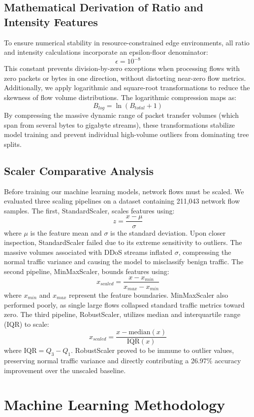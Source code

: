 \documentclass[journal]{IEEEtran}
\begin{document}
\subsection{Mathematical Derivation of Ratio and Intensity Features}
To ensure numerical stability in resource-constrained edge environments, all ratio and intensity calculations incorporate an epsilon-floor denominator:
$$\epsilon = 10^{-8}$$
This constant prevents division-by-zero exceptions when processing flows with zero packets or bytes in one direction, without distorting near-zero flow metrics. Additionally, we apply logarithmic and square-root transformations to reduce the skewness of flow volume distributions. The logarithmic compression maps as:
$$B_{log} = \ln(B_{total} + 1)$$
By compressing the massive dynamic range of packet transfer volumes (which span from several bytes to gigabyte streams), these transformations stabilize model training and prevent individual high-volume outliers from dominating tree splits.

\subsection{Scaler Comparative Analysis}
Before training our machine learning models, network flows must be scaled. We evaluated three scaling pipelines on a dataset containing 211,043 network flow samples. The first, StandardScaler, scales features using:
$$z = \frac{x - \mu}{\sigma}$$
where $\mu$ is the feature mean and $\sigma$ is the standard deviation. Upon closer inspection, StandardScaler failed due to its extreme sensitivity to outliers. The massive volumes associated with DDoS streams inflated $\sigma$, compressing the normal traffic variance and causing the model to misclassify benign traffic. The second pipeline, MinMaxScaler, bounds features using:
$$x_{scaled} = \frac{x - x_{min}}{x_{max} - x_{min}}$$
where $x_{min}$ and $x_{max}$ represent the feature boundaries. MinMaxScaler also performed poorly, as single large flows collapsed standard traffic metrics toward zero. The third pipeline, RobustScaler, utilizes median and interquartile range (IQR) to scale:
$$x_{scaled} = \frac{x - \text{median}(x)}{\text{IQR}(x)}$$
where $\text{IQR} = Q_3 - Q_1$. RobustScaler proved to be immune to outlier values, preserving normal traffic variance and directly contributing a 26.97\% accuracy improvement over the unscaled baseline.

\section{Machine Learning Methodology}
\end{document}
